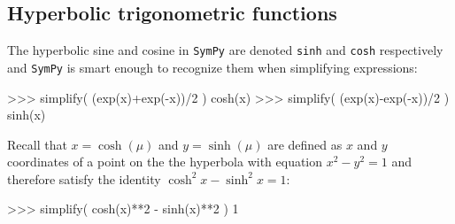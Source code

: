 \subsection{Hyperbolic trigonometric functions}
\label{basics:hyperbolic_trigonometric_functions}

The hyperbolic sine and cosine in \texttt{SymPy} are denoted \texttt{sinh} and \texttt{cosh} respectively
and \texttt{SymPy} is smart enough to recognize them when simplifying expressions:

\small
\begin{verbatimtab}
>>> simplify( (exp(x)+exp(-x))/2 )
cosh(x)
>>> simplify( (exp(x)-exp(-x))/2 )
sinh(x)
\end{verbatimtab}
\normalsize
Recall that $x=\cosh(\mu)$ and $y=\sinh(\mu)$ are defined as $x$ and $y$ coordinates of a point on the 
the hyperbola with equation $x^2 - y^2 = 1$ and therefore satisfy the identity $\cosh^2 x - \sinh^2 x =1$:



\small
\begin{verbatimtab}
>>> simplify( cosh(x)**2 - sinh(x)**2 )
1
\end{verbatimtab}
\normalsize